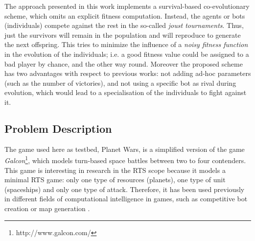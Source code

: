 \documentclass[conference]{IEEEtran}
\begin{document}
The approach presented in this work implements a survival-based co-evolutionary scheme, which omits an explicit fitness computation. Instead, the agents or bots (individuals) compete against the rest in the so-called \textit{joust tournaments}. Thus, just the survivors will remain in the population and will reproduce to generate the next offspring.
This tries to minimize the influence of a \textit{noisy fitness function} \cite{Genebot_JCST} in the evolution of the individuals; i.e. a good fitness value could be assigned to a bad player by chance, and the other way round. Moreover the proposed scheme has two advantages with respect to previous works: not adding ad-hoc parameters (such as the number of victories), and not using a specific bot as rival during evolution, which would lead to a specialisation of the individuals to fight against it.



%
%

\subsection{Problem Description} %
\label{sec:problemDescription}

The game used here as testbed, Planet Wars, is a simplified version of the game
{\em Galcon}\footnote{http://www.galcon.com/},
which models turn-based space battles between two to four
contenders. This game is interesting in research in the RTS scope because it models a minimal RTS game: only one type of resources (planets), one type of unit (spaceships) and only one type of attack. Therefore, it has been used previously in different fields of computational intelligence in games, such as competitive bot creation \cite{ziolko2012automatic,NogueiraCoevolutionary14} or map generation \cite{LaraMaps14,LaraCabrera2014aesthetic}.
\end{document}
